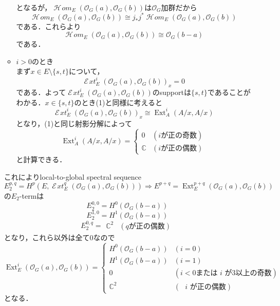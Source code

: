 \documentclass[uplatex,a4paper,11pt,dvipdfmx]{jsarticle}
\makeatletter
\theoremstyle{mystyle} %
\renewenvironment{proof}[1][\proofname]{\par
 \pushQED{\qed}%
 \normalfont \topsep6\p@\@plus6\p@\relax
 \trivlist
 \item[\hskip\labelsep
 \itshape
 {\bf\underline{#1}}]\ignorespaces
}{%
 \popQED\endtrivlist\@endpefalse
}
\DeclareMathOperator{\Ext}{Ext}
\newcommand{\Homsheaf}{\mathop{\mathcal{H}\! \mathit{om}}\nolimits}
\newcommand{\Extsheaf}{\mathop{\mathcal{E}\! \mathit{xt}}\nolimits}
\makeatother
\begin{document}
\begin{proof}
\begin{enumerate}
\begin{itemize}
\begin{align*}
			            \end{align*}
			            となるが，$\Homsheaf_E(\mathcal{O}_G(a), \mathcal{O}_G(b))$は$\mathcal{O}_G$加群だから$$\Homsheaf_E(\mathcal{O}_G(a), \mathcal{O}_G(b)) \cong j_*j^*\Homsheaf_E(\mathcal{O}_G(a), \mathcal{O}_G(b))$$である．これらより$$\Homsheaf_E(\mathcal{O}_G(a), \mathcal{O}_G(b)) \cong \mathcal{O}_G(b-a)$$である．
			      \item $i>0$のとき\\
			            まず$x \in E\setminus\{s, t\}$について，$$\Extsheaf^i_E(\mathcal{O}_G(a), \mathcal{O}_{G}(b))_x =0$$である．よって$\Extsheaf^i_E(\mathcal{O}_G(a), \mathcal{O}_{G}(b))$のsupportは$\{s, t\}$であることがわかる．$x \in \{s, t\}$のとき(1)と同様に考えると$$\Extsheaf^i_E(\mathcal{O}_G(a), \mathcal{O}_{G}(b))_x \cong \Ext^i_A(A/x, A/x)$$となり，(1)と同じ射影分解によって$$ \Ext^i_A(A/x, A/x) = \left \{
				            \begin{array}{ll}
					            0          & (\text{$i$が正の奇数}) \\
					            \mathbb{C} & (\text{$i$が正の偶数})
				            \end{array}
				            \right.$$と計算できる．
		      \end{itemize}
		      これによりlocal-to-global spectral sequence$$E_2^{p, q} = H^p(E, \Extsheaf^q_E(\mathcal{O}_G(a), \mathcal{O}_G(b))) \Rightarrow E^{p+q} = \Ext^{p+q}_E(\mathcal{O}_G(a), \mathcal{O}_G(b))$$の$E_2$-termは$$E_2^{0, 0} = H^0(\mathcal{O}_G(b-a))$$
		      $$E_2^{1,0} = H^1(\mathcal{O}_G(b-a))$$$$E_2^{0, q} =
			      \begin{array}{ll}
				      \mathbb{C}^2 & (\text{$q$が正の偶数})
			      \end{array}$$となり，これら以外は全て$0$なので$$\Ext^i_E(\mathcal{O}_G(a), \mathcal{O}_G(b)) =\left \{
			      \begin{array}{ll}
				      H^0(\mathcal{O}_G(b-a)) & (i=0)                                     \\
				      H^1(\mathcal{O}_G(b-a)) & (i=1)                                     \\
				      0                       & (i < 0 \text{または $i$ が$3$以上の奇数}) \\
				      \mathbb{C}^2            & (\text{ $i$ が正の偶数})
			      \end{array}
			      \right.$$となる．



\end{enumerate}
\end{proof}
\end{document}
